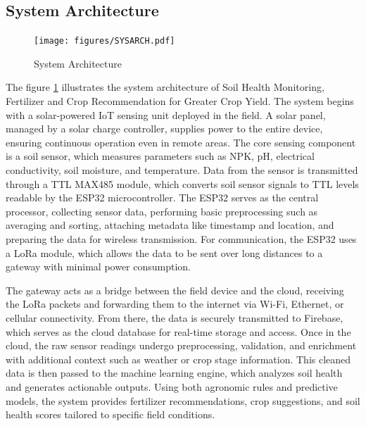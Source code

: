 {	\subsection{System Architecture}
	\begin{figure}[H]
		\centering
		\caption{System Architecture}
		\label{fig:SystemArchitecture}
		\texttt{[image: figures/SYSARCH.pdf]}
	\end{figure}
	
	The figure \ref{fig:SystemArchitecture} illustrates the system architecture of Soil Health Monitoring, Fertilizer and Crop Recommendation for Greater Crop Yield. The system begins with a solar-powered IoT sensing unit deployed in the field. A solar panel, managed by a solar charge controller, supplies power to the entire device, ensuring continuous operation even in remote areas. The core sensing component is a soil sensor, which measures parameters such as NPK, pH, electrical conductivity, soil moisture, and temperature. Data from the sensor is transmitted through a TTL MAX485 module, which converts soil sensor signals to TTL levels readable by the ESP32 microcontroller. The ESP32 serves as the central processor, collecting sensor data, performing basic preprocessing such as averaging and sorting, attaching metadata like timestamp and location, and preparing the data for wireless transmission. For communication, the ESP32 uses a LoRa module, which allows the data to be sent over long distances to a gateway with minimal power consumption.
	
	The gateway acts as a bridge between the field device and the cloud, receiving the LoRa packets and forwarding them to the internet via Wi-Fi, Ethernet, or cellular connectivity. From there, the data is securely transmitted to Firebase, which serves as the cloud database for real-time storage and access. Once in the cloud, the raw sensor readings undergo preprocessing, validation, and enrichment with additional context such as weather or crop stage information. This cleaned data is then passed to the machine learning engine, which analyzes soil health and generates actionable outputs. Using both agronomic rules and predictive models, the system provides fertilizer recommendations, crop suggestions, and soil health scores tailored to specific field conditions.
	
}
